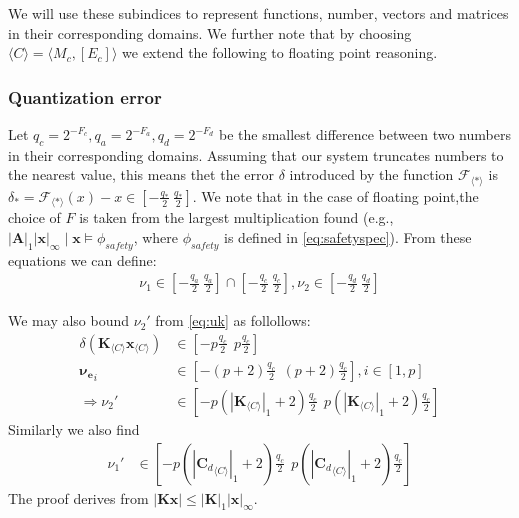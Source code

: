 \documentclass[sigconf]{llncs}
\newcommand{\mat}[1]{\boldsymbol{#1}}
\renewcommand{\vec}[1]{\boldsymbol{#1}}
\begin{document}
We will use these subindices to represent functions, number, vectors and matrices in their
corresponding domains. We further note that by choosing $\langle C \rangle = \langle M_c,[E_c] \rangle$
we extend the following to floating point reasoning.

\subsubsection{Quantization error}
\label{appendix:quantization}

Let $q_c=2^{-F_c},q_a=2^{-F_a},q_d=2^{-F_d}$ be the smallest difference
between two numbers in their corresponding domains.  Assuming that our
system truncates numbers to the nearest value, this means thet the error
$\delta$ introduced by the function $\mathcal{F}_{\langle * \rangle}$ is
$\delta_*=\mathcal{F}_{\langle * \rangle}(x)-x \in \left[-\frac{q_*}{2}\
\frac{q_*}{2}\right]$.  We note that in the case of floating point,the
choice of $F$ is taken from the largest multiplication found (e.g.,
$|\mat{A}|_1|\vec{x}|_\infty \mid \vec{x} \models \phi_\mathit{safety}$,
where $\phi_\mathit{safety}$ is defined in \ref{eq:safetyspec}). From these
equations we can define:
%
\begin{align*}
\nu_1 \in \left[-\frac{q_a}{2}\ \frac{q_a}{2}\right] \cap  \left[-\frac{q_c}{2}\ \frac{q_c}{2}\right],
\nu_2 \in \left[-\frac{q_d}{2}\ \frac{q_d}{2}\right]
\end{align*}

We may also bound $\nu_2'$ from \eqref{eq:uk} as follollows:
\begin{align*}
\delta\left(\mat{K}_{\langle C\rangle} \vec{x}_{\langle C\rangle} \right) &\in \left[ -p \frac{q_c}{2}\ \ p \frac{q_c}{2}\right]\\
{\vec{\nu_e}}_i &\in \left[ -(p+2) \frac{q_c}{2}\ \ (p+2) \frac{q_c}{2}\right], i \in [1, p]\\
\Rightarrow \nu_2' &\in \left[  -p(|\mat{K}_{\langle C \rangle}|_1+2) \frac{q_c}{2}\ \ p(|\mat{K}_{\langle C \rangle}|_1+2) \frac{q_c}{2}\right]
\end{align*}
Similarly we also find
\begin{align*}
\nu_1' &\in \left[  -p(|{\mat{C}_d}_{\langle C \rangle}|_1+2) \frac{q_c}{2}\ \ p(|{\mat{C}_d}_{\langle C \rangle}|_1+2) \frac{q_c}{2}\right]
\end{align*}
The proof derives from $|\mat{K}\vec{x}| \leq |\mat{K}|_1|\vec{x}|_\infty$.
\end{document}
